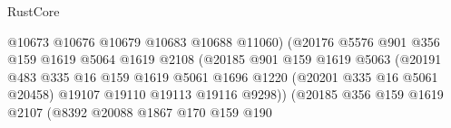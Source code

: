 \begin{lexlean}{RustCore}
\begin{coremodule}
                                                @10673
                                                @10676
                                                @10679
                                                @10683
                                                @10688
                                                @11060)
                                              (@20176
                                                @5576
                                                @901
                                                @356
                                                @159
                                                @1619
                                                @5064
                                                @1619
                                                @2108
                                                (@20185
                                                  @901
                                                  @159
                                                  @1619
                                                  @5063
                                                  (@20191
                                                    @483
                                                    @335
                                                    @16
                                                    @159
                                                    @1619
                                                    @5061
                                                    @1696
                                                    @1220
                                                    (@20201 @335 @16 @5061 @20458)
                                                    @19107
                                                    @19110
                                                    @19113
                                                    @19116
                                                    @9298))
                                                (@20185
                                                  @356
                                                  @159
                                                  @1619
                                                  @2107
                                                  (@8392
                                                    @20088
                                                    @1867
                                                    @170
                                                    @159
                                                    @190

\end{coremodule}
\end{lexlean}
